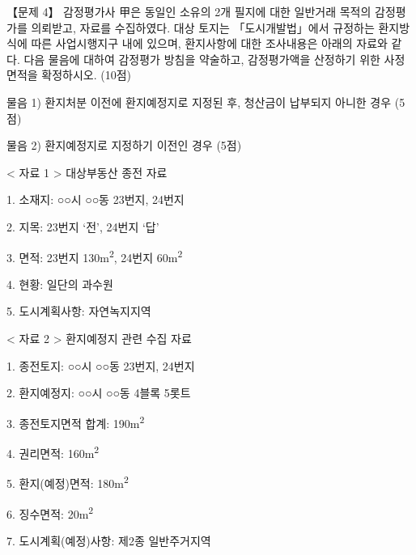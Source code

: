 \begin{longquestion}{【문제 4】}
감정평가사 甲은 동일인 소유의 2개 필지에 대한 일반거래 목적의 감정평가를 의뢰받고, 자료를 수집하였다. 대상 토지는 「도시개발법」에서 규정하는 환지방식에 따른 사업시행지구 내에 있으며, 환지사항에 대한 조사내용은 아래의 자료와 같다. 다음 물음에 대하여 감정평가 방침을 약술하고, 감정평가액을 산정하기 위한 사정 면적을 확정하시오. (10점) \par
\medskip\noindent 물음 1) 환지처분 이전에 환지예정지로 지정된 후, 청산금이 납부되지 아니한 경우 (5점) \par
\medskip\noindent 물음 2) 환지예정지로 지정하기 이전인 경우 (5점) \par
< 자료 1 > 대상부동산 종전 자료 \par
1. 소재지: ○○시 ○○동 23번지, 24번지 \par
2. 지목: 23번지 ‘전’, 24번지 ‘답’ \par
3. 면적: 23번지 130m\textsuperscript{2}, 24번지 60m\textsuperscript{2} \par
4. 현황: 일단의 과수원 \par
5. 도시계획사항: 자연녹지지역 \par
< 자료 2 > 환지예정지 관련 수집 자료 \par
1. 종전토지: ○○시 ○○동 23번지, 24번지 \par
2. 환지예정지: ○○시 ○○동 4블록 5롯트 \par
3. 종전토지면적 합계: 190m\textsuperscript{2} \par
4. 권리면적: 160m\textsuperscript{2} \par
5. 환지(예정)면적: 180m\textsuperscript{2} \par
6. 징수면적: 20m\textsuperscript{2} \par
7. 도시계획(예정)사항: 제2종 일반주거지역 \par
\end{longquestion}
